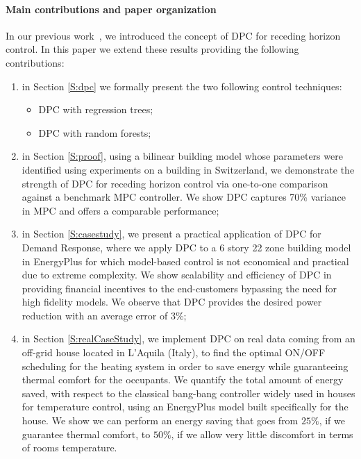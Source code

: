\paragraph{Main contributions and paper organization}
In our previous work~\cite{Behl2016,Jain2016,JainACC2017,JainCDC2017}, we introduced the concept of DPC for receding horizon control. In this paper we extend these results providing the following contributions:
\begin{enumerate}
	\item in Section \ref{S:dpc} we formally present the two following control techniques:
	\begin{itemize}
		\item DPC with regression trees;
		\item DPC with random forests;
	\end{itemize}
	\item in Section \ref{S:proof}, using a bilinear building model whose parameters were identified using experiments on a building in Switzerland, we demonstrate the strength of DPC for receding horizon control via one-to-one comparison against a benchmark MPC controller. We show DPC captures 70\% variance in MPC and offers a comparable performance;
	\item in Section \ref{S:casestudy}, we present a practical application of DPC for Demand Response, where we apply DPC to a 6 story 22 zone building model in EnergyPlus \cite{Crawley2001} for which model-based control is not economical and practical due to extreme complexity. We show scalability and efficiency of DPC in providing financial incentives to the end-customers bypassing the need for high fidelity models. We observe that DPC provides the desired power reduction with an average error of 3\%;
	\item in Section \ref{S:realCaseStudy}, we implement DPC on real data coming from an off-grid house located in L'Aquila (Italy), to find the optimal ON/OFF scheduling for the heating system in order to save energy while guaranteeing thermal comfort for the occupants. We quantify the total amount of energy saved, with respect to the classical bang-bang controller widely used in houses for temperature control, using an EnergyPlus model built specifically for the house. We show we can perform an energy saving that goes from $25\%$, if we guarantee thermal comfort, to $50\%$, if we allow very little discomfort in terms of rooms temperature.
\end{enumerate}

